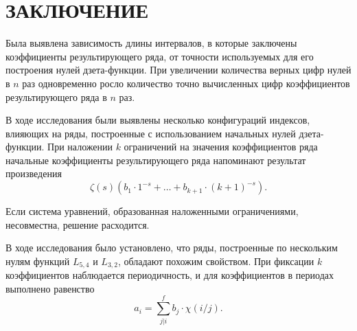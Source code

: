\documentclass[intlimits,twoside,a4paper,11pt]{article}
\begin{document}
    \section{ЗАКЛЮЧЕНИЕ}

    Была выявлена зависимость длины интервалов, в которые заключены коэффициенты результирующего ряда, от точности
    используемых для его построения нулей дзета-функции. При увеличении количества верных цифр нулей в $n$ раз одновременно
    росло количество точно вычисленных цифр коэффициентов результирующего ряда в $n$ раз.

    В ходе исследования были выявлены несколько конфигураций индексов, влияющих на ряды, построенные с использованием 
    начальных нулей дзета-функции. При наложении $k$ ограничений на значения коэффициентов ряда начальные коэффициенты
    результирующего ряда напоминают результат произведения
    \begin{equation}
        \zeta(s)\left(b_1\cdot 1^{-s} + \dots + b_{k+1} \cdot (k+1)^{-s}\right) .
    \end{equation}

    Если система уравнений, образованная наложенными ограничениями, несовместна, решение расходится.

    В ходе исследования было установлено, что ряды, построенные по нескольким нулям функций $L_{5, 4}$ и $L_{3, 2}$, обладают
    похожим свойством. При фиксации $k$ коэффициентов наблюдается периодичность, и для коэффициентов в периодах выполнено равенство
    \begin{equation}
        a_i = \sum_{j|i}^{f}{b_j \cdot \chi(i/j)}.
    \end{equation}

     
    




\end{document}
